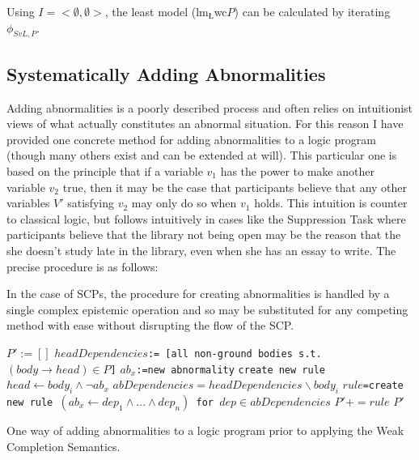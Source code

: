 \documentclass{article}
\begin{document}
Using $I=<\emptyset, \emptyset>$, the least model ($\textrm{lm}_\textrm{\L}$wc$P$) can be calculated by iterating $\phi_{SvL,P}$.

\subsection{Systematically Adding Abnormalities} \label{ssec:addAbnormalities}
Adding abnormalities is a poorly described process and often relies on intuitionist views of what actually constitutes an abnormal situation. For this reason I have provided one concrete method for adding abnormalities to a logic program (though many others exist and can be extended at will). This particular one is based on the principle that if a variable $v_1$ has the power to make another variable $v_2$ true, then it may be the case that participants believe that any other variables $V'$ satisfying $v_2$ may only do so when $v_1$ holds. This intuition is counter to classical logic, but follows intuitively in cases like the Suppression Task where participants believe that the library not being open may be the reason that the she doesn't study late in the library, even when she has an essay to write. The precise procedure is as follows:


In the case of SCPs, the procedure for creating abnormalities is handled by a single complex epistemic operation and so may be substituted for any competing method with ease without disrupting the flow of the SCP.



\begin{algorithm}
\begin{algorithmic}[1]
\State \texttt{$P':=[]$}
\State \texttt{$headDependencies$:= [all non-ground bodies s.t.$(body \rightarrow head) \in P$]}
\State \texttt{$ab_{x}$:=new abnormality} 
\State \texttt{create new rule $head \leftarrow body_i \land \lnot ab_x$} 
\State \texttt {$abDependencies = headDependencies \backslash body_i$}
\State \texttt{$rule$=create new rule $(ab_x \leftarrow dep_1 \land ... \land dep_n)$ for $dep \in abDependencies$}
\State $P'+=rule$
\EndFor
\EndFor
\State \Return $P'$
\EndFunction
\end{algorithmic}
\caption{One way of adding abnormalities to a logic program prior to applying the Weak Completion Semantics.}
\label{alg:addAbnormalities}
\end{algorithm}
\end{document}
